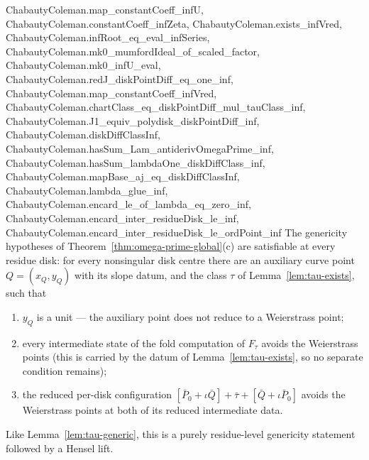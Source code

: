 \begin{lemma}
{  ChabautyColeman.map_constantCoeff_infU, ChabautyColeman.constantCoeff_infZeta,
  ChabautyColeman.exists_infVred, ChabautyColeman.infRoot_eq_eval_infSeries,
  ChabautyColeman.mk0_mumfordIdeal_of_scaled_factor, ChabautyColeman.mk0_infU_eval,
  ChabautyColeman.redJ_diskPointDiff_eq_one_inf, ChabautyColeman.map_constantCoeff_infVred,
  ChabautyColeman.chartClass_eq_diskPointDiff_mul_tauClass_inf,
  ChabautyColeman.J1_equiv_polydisk_diskPointDiff_inf, ChabautyColeman.diskDiffClassInf,
  ChabautyColeman.hasSum_Lam_antiderivOmegaPrime_inf,
  ChabautyColeman.hasSum_lambdaOne_diskDiffClass_inf,
  ChabautyColeman.mapBase_aj_eq_diskDiffClassInf, ChabautyColeman.lambda_glue_inf,
  ChabautyColeman.encard_le_of_lambda_eq_zero_inf,
  ChabautyColeman.encard_inter_residueDisk_le_inf,
  ChabautyColeman.encard_inter_residueDisk_le_ordPoint_inf}
\leanok
The genericity hypotheses of Theorem~\ref{thm:omega-prime-global}(c) are satisfiable at
every residue disk: for every nonsingular disk centre there are an auxiliary curve point
$Q = (x_Q, y_Q)$ with its slope datum, and the class $\tau$ of
Lemma~\ref{lem:tau-exists}, such that
\begin{enumerate}
\item $y_Q$ is a unit --- the auxiliary point does not reduce to a Weierstrass point;
\item every intermediate state of the fold computation of $F_\tau$ avoids the
Weierstrass points (this is carried by the datum of Lemma~\ref{lem:tau-exists}, so no
separate condition remains);
\item the reduced per-disk configuration
$[\bar P_0 + \iota\bar Q] + \bar\tau + [\bar Q + \iota \bar P_0]$ avoids the
Weierstrass points at both of its reduced intermediate data.
\end{enumerate}
Like Lemma~\ref{lem:tau-generic}, this is a purely residue-level genericity statement
followed by a Hensel lift.
\end{lemma}
